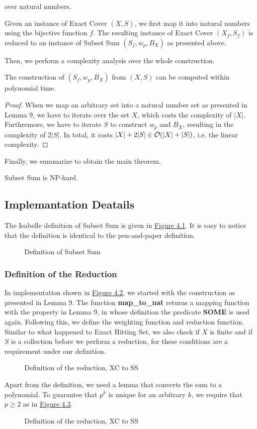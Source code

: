 over natural numbers. 
\begin{definition}
    Given an instance of Exact Cover $(X, S)$, 
    we first map it into natural numbers using the bijective function $f$. 
    The resulting instance of Exact Cover $(X_f, S_f)$ is reduced to an instance of Subset Sum $(S_f, w_p, B_X)$ as presented above.
\end{definition}
Then, we perform a complexity analysis over the whole construction.
\begin{lemma}
    The construction of $(S_f, w_p, B_X)$ from $(X, S)$ can be computed within polynomial time. 
\end{lemma}
\begin{proof}
    When we map an arbitrary set into a natural number set as presented in Lemma 9, we have to iterate over the set $X$, which costs the complexity of $|X|$. 
Furthremore, we have to iterate $S$ to construct $w_p$ and $B_X$, resulting in the complexity of $2|S|$. In total, it costs $|X| + 2|S| \in\mathcal{O}({|X| + |S|})$, 
i.e. the linear complexity. 
\end{proof}
Finally, we summarize to obtain the main theorem.
\begin{theorem}
    Subset Sum is NP-hard.
\end{theorem}

\subsection{Implemantation Deatails}
The Isabelle definition of Subset Sum is given in \hyperref[fig:4.1]{Figure 4.1}. 
It is easy to notice that the definition is identical to the pen-and-paper definition.
\begin{figure}[!h]
    \caption{Definition of Subset Sum}
    \label{fig:4.1}
\end{figure}
\subsubsection{Definition of the Reduction}
In implementation shown in \hyperref[fig:4.2]{Figure 4.2}, we started with the construction as presented in Lemma 9. The function \textbf{map\_to\_nat} returns 
a mapping function with the property in Lemma 9, in whose definition the predicate \textbf{SOME} is used again.
Following this, we define the weighting function and reduction function. 
Similar to what happened to Exact Hitting Set, we also check if $X$ is finite and if $S$ is 
a collection before we perform a reduction, for these conditions are a requirement under our definition. 
\begin{figure}[!h]
    \caption{Definition of the reduction, XC to SS}
    \label{fig:4.2}
\end{figure}
Apart from the definition, we need a lemma that converts the sum to a polynomial. To guarantee that $p^k$ is unique for an arbitrary $k$, 
we require that $p \geq 2$ as in \hyperref[fig:4.3]{Figure 4.3}.
\begin{figure}[!h]
    \caption{Definition of the reduction, XC to SS}
    \label{fig:4.3}
\end{figure}

